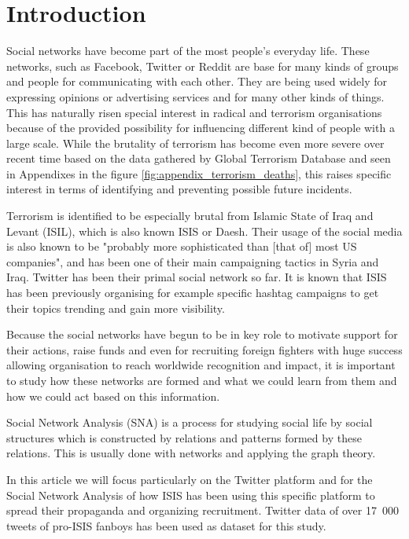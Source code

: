 \documentclass[conference]{IEEEtran}
\begin{document}
    \section{Introduction}\label{sec:introduction}

    Social networks have become part of the most people's everyday life.
    These networks, such as Facebook, Twitter or Reddit are base for many kinds of groups and people for communicating with each other.
    They are being used widely for expressing opinions or advertising services and for many other kinds of things.
    This has naturally risen special interest in radical and terrorism organisations because of the provided possibility for
    influencing different kind of people with a large scale.
    While the brutality of terrorism has become even more severe over recent time based on the data gathered by Global
    Terrorism Database and seen in Appendixes in the figure \ref{fig:appendix_terrorism_deaths}, this raises specific interest
    in terms of identifying and preventing possible future incidents.

    Terrorism is identified to be especially brutal from Islamic State of Iraq and Levant (ISIL), which is also known ISIS
    or Daesh.\cite{enwiki:1024074085}
    Their usage of the social media is also known to be "probably more sophisticated than [that of] most US companies",\cite{isis-selling-terror}
    and has been one of their main campaigning tactics in Syria and Iraq.
    Twitter has been their primal social network\cite{isis-how-twitter} so far.
    It is known that ISIS has been previously organising for example specific hashtag campaigns to get their topics
    trending and gain more visibility\cite{isis-how-twitter}.

    Because the social networks have begun to be in key role to motivate support for their actions, raise funds and even for recruiting
    foreign fighters with huge success\cite{isis-foreign-fighter} allowing organisation to reach worldwide recognition and impact,
    it is important to study how these networks are formed and what we could learn from them and how we could act based on this information.

    Social Network Analysis (SNA) is a process for studying social life by social structures which is constructed by relations and patterns formed by these relations.
    This is usually done with networks and applying the graph theory.\cite{marin2011social, doi:10.1177/016555150202800601}

    In this article we will focus particularly on the Twitter platform and for the Social Network Analysis of how ISIS has been using this specific
    platform to spread their propaganda and organizing recruitment.
    Twitter data of over 17~000 tweets of pro-ISIS fanboys has been used as dataset for this study.
\end{document}
